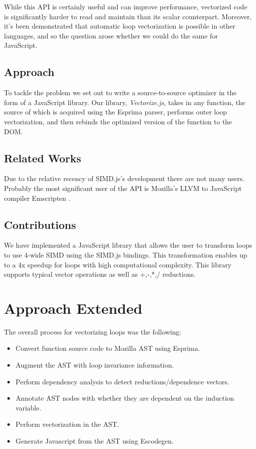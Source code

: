 \documentclass[conference]{IEEEtran}
\begin{document}
  While this API is certainly useful and can improve performance, vectorized
  code is significantly harder to read and maintain than its scalar counterpart.
  Moreover, it's been demonstrated that automatic loop vectorization is possible
  in other languages, and so the question arose whether we could do the same
  for JavaScript.

\subsection{Approach}

  To tackle the problem we set out to write a source-to-source optimizer in the
  form of a JavaScript library. Our library, \textit{Vectorize.js}, takes in
  any function, the source of which is acquired using the Esprima parser,
  performs outer loop vectorization, and then rebinds the optimized version of
  the function to the DOM.

\subsection{Related Works}

  Due to the relative recency of SIMD.js's development there are not many
  users. Probably the most significant user of the API is Mozilla's LLVM to
  JavaScript compiler Emscripten \cite{emscripten}.

\subsection{Contributions}

We have implemented a JavaScript library that allows the user to transform 
loops to use 4-wide SIMD using the SIMD.js bindings. This transformation
enables up to a 4x speedup for loops with high computational complexity. 
This library supports typical vector operations as well as +,-,*,/ reductions.

\section{Approach Extended}

The overall process for vectorizing loops was the following:
\begin{itemize}
    \item Convert function source code to Mozilla AST using Esprima\cite{esprima}.
\item Augment the AST with loop invariance information.
\item Perform dependency analysis to detect reductions/dependence vectors.
\item Annotate AST nodes with whether they are dependent on the induction variable.
\item Perform vectorization in the AST.
\item Generate Javascript from the AST using Escodegen\cite{escodegen}.
\end{itemize}
\end{document}
